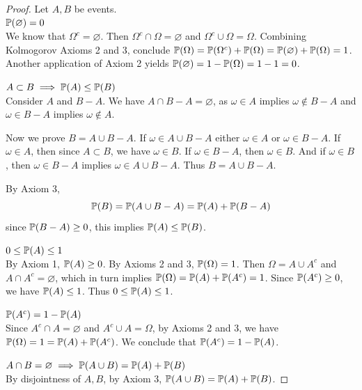 \documentclass[a4paper]{article}
\begin{document}
\newpage
{}
\begin{proof}[Proof]
Let \(A, B\) be events. \\
\underline{$\mathbb{P}(\varnothing) = 0$} \\
We know that $\Omega^{c} = \varnothing$. Then $\Omega^{c} \cap \Omega = \varnothing$ and $\Omega^{c} \cup \Omega = \Omega$. Combining Kolmogorov Axioms 2 and 3, conclude $\mathbb{P}(\Omega) = \mathbb{P}(\Omega^{c}) + \mathbb{P}(\Omega) = \mathbb{P}(\varnothing) + \mathbb{P}(\Omega) = 1$. Another application of Axiom 2 yields $\mathbb{P}(\varnothing) = 1 - \mathbb{P}(\Omega) = 1 - 1 = 0$.

\underline{$A \subset B \implies \mathbb{P}(A) \le \mathbb{P}(B)$} \\
Consider \(A\) and \(B-A\). We have \(A \cap B-A = \varnothing\), as \(\omega \in A\) implies \(\omega \not\in B-A\) and \(\omega \in B-A\) implies \(\omega \not\in A\). 

Now we prove \(B = A \cup B-A\). If \(\omega \in A \cup B-A\) either \(\omega \in A\) or \(\omega \in B-A\). If \(\omega \in A\), then since \(A \subset B\), we have \(\omega \in B\). If \(\omega \in B-A\), then \(\omega \in B\). And if \(\omega \in B\), then \(\omega \in B-A\) implies \(\omega \in A \cup B-A\). Thus \(B = A \cup B-A\).

By Axiom 3,
\[
	\mathbb{P}(B) = \mathbb{P}(A \cup B-A) = \mathbb{P}(A) + \mathbb{P}(B-A)
\]
since \(\mathbb{P}(B-A) \ge 0\), this implies \(\mathbb{P}(A) \le \mathbb{P}(B)\).

\underline{\(0 \le \mathbb{P}(A) \le 1\)} \\
By Axiom 1, \(\mathbb{P}(A) \ge 0\). By Axioms 2 and 3, \(\mathbb{P}(\Omega) = 1 \). Then \(\Omega = A \cup A^{c}\) and \(A \cap A^{c} = \varnothing\), which in turn implies \(\mathbb{P}(\Omega) = \mathbb{P}(A) + \mathbb{P}(A^{c}) = 1\). Since \(\mathbb{P}(A^{c}) \ge 0\), we have \(\mathbb{P}(A) \le 1\). Thus \(0 \le \mathbb{P}(A) \le 1\).

\underline{\(\mathbb{P}(A^{c}) = 1 - \mathbb{P}(A)\)} \\
Since \(A^{c} \cap A = \varnothing\) and \(A^{c} \cup A = \Omega\), by Axioms 2 and 3, we have \(\mathbb{P}(\Omega) = 1 = \mathbb{P}(A) + \mathbb{P}(A^{c})\). We conclude that \(\mathbb{P}(A^{c}) = 1 - \mathbb{P}(A)\).

\underline{\(A \cap B = \varnothing \implies \mathbb{P}(A \cup B) = \mathbb{P}(A) + \mathbb{P}(B)\)} \\
By disjointness of \(A,B\), by Axiom 3, \(\mathbb{P}(A \cup B) = \mathbb{P}(A) + \mathbb{P}(B)\).
\end{proof}
\end{document}
